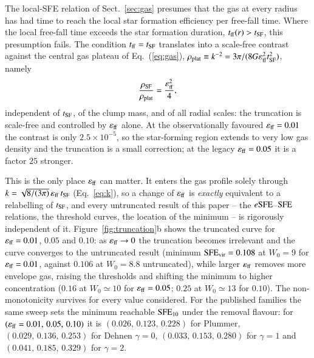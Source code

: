 \documentclass{aa}
\newcommand{\esfe}{e{\rm SFE}}
\newcommand{\sfe}{{\rm SFE}}
\newcommand{\tsf}{t_{\rm SF}}
\newcommand{\tff}{t_{\rm ff}}
\newcommand{\effE}{\varepsilon_{\rm ff}}
\begin{document}
The local-SFE relation of Sect.~\ref{sec:gas} presumes that the gas at
every radius has had time to reach the local star formation efficiency
per free-fall time. Where the local free-fall time exceeds the star
formation duration, $\tff(r)>\tsf$, this presumption fails. The
condition $\tff=\tsf$ translates into a scale-free contrast against the
central gas plateau of Eq.~(\ref{eq:gas}),
$\rho_{\rm plat}\equiv k^{-2}=3\pi/(8G\effE^2\tsf^2)$, namely
\begin{equation}
  \frac{\rho_{\rm SF}}{\rho_{\rm plat}} = \frac{\effE^2}{4},
  \label{eq:trunc}
\end{equation}
independent of $\tsf$, of the clump mass, and of all radial scales: the
truncation is scale-free and controlled by $\effE$ alone. At the
observationally favoured $\effE=0.01$ the contrast is only
$2.5\times10^{-5}$, so the star-forming region extends to very low gas
density and the truncation is a small correction; at the legacy
$\effE=0.05$ it is a factor $25$ stronger.

This is the only place $\effE$ can matter. It enters the gas profile
solely through $k=\sqrt{8/(3\pi)}\,\effE\,\tsf$ (Eq.~\ref{eq:k}), so a
change of $\effE$ is \emph{exactly} equivalent to a relabelling of
$\tsf$, and every untruncated result of this paper -- the
$\esfe$--$\sfe$ relations, the threshold curves, the location of the
minimum -- is rigorously independent of it. Figure~\ref{fig:truncation}b
shows the truncated curve for $\effE=0.01$, $0.05$ and $0.10$: as
$\effE\rightarrow0$ the truncation becomes irrelevant and the curve
converges to the untruncated result (minimum $\sfe_{\rm vir}=0.108$ at
$W_0=9$ for $\effE=0.01$, against $0.106$ at $W_0=8.8$ untruncated),
while larger $\effE$ removes more envelope gas, raising the thresholds
and shifting the minimum to higher concentration ($0.16$ at
$W_0\simeq10$ for $\effE=0.05$; $0.25$ at $W_0\simeq13$ for $0.10$). The
non-monotonicity survives for every value considered. For the published
families the same sweep sets the minimum reachable $\sfe_{10}$ under the
removal flavour: for $(\effE=0.01,\,0.05,\,0.10)$ it is
$(0.026,\,0.123,\,0.228)$ for Plummer, $(0.029,\,0.136,\,0.253)$ for
Dehnen $\gamma=0$, $(0.033,\,0.153,\,0.280)$ for $\gamma=1$ and
$(0.041,\,0.185,\,0.329)$ for $\gamma=2$.
\end{document}
